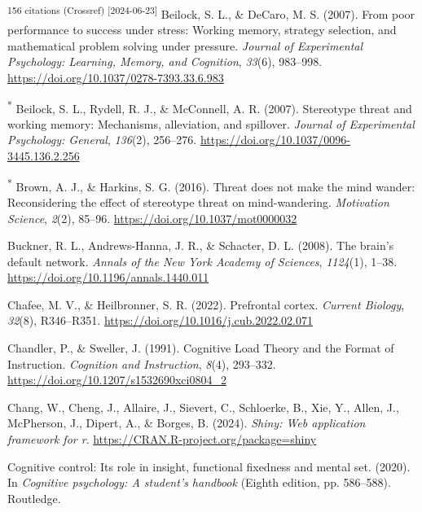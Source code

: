\documentclass[
  stu, a4paper,floatsintext]{apa7}
\newlength{\cslhangindent}
\newenvironment{CSLReferences}[2] %
 {\begin{list}{}{%
  \setlength{\itemindent}{0pt}
  \setlength{\leftmargin}{0pt}
  \setlength{\parsep}{0pt}
  \ifodd #1
   \setlength{\leftmargin}{\cslhangindent}
   \setlength{\itemindent}{-1\cslhangindent}
  \fi
  \setlength{\itemsep}{#2\baselineskip}}}
 {\end{list}}
\begin{document}
\begin{CSLReferences}{1}{0}
\textsuperscript{156 citations (Crossref) {[}2024-06-23{]}} Beilock, S. L., \& DeCaro, M. S. (2007). From poor performance to success under stress: {Working} memory, strategy selection, and mathematical problem solving under pressure. \emph{Journal of Experimental Psychology: Learning, Memory, and Cognition}, \emph{33}(6), 983--998. \url{https://doi.org/10.1037/0278-7393.33.6.983}

\textsuperscript{*} Beilock, S. L., Rydell, R. J., \& McConnell, A. R. (2007). Stereotype threat and working memory: {Mechanisms}, alleviation, and spillover. \emph{Journal of Experimental Psychology: General}, \emph{136}(2), 256--276. \url{https://doi.org/10.1037/0096-3445.136.2.256}

\textsuperscript{*} Brown, A. J., \& Harkins, S. G. (2016). Threat does not make the mind wander: {Reconsidering} the effect of stereotype threat on mind-wandering. \emph{Motivation Science}, \emph{2}(2), 85--96. \url{https://doi.org/10.1037/mot0000032}

Buckner, R. L., Andrews-Hanna, J. R., \& Schacter, D. L. (2008). The brain's default network. \emph{Annals of the New York Academy of Sciences}, \emph{1124}(1), 1--38. \url{https://doi.org/10.1196/annals.1440.011}

Chafee, M. V., \& Heilbronner, S. R. (2022). Prefrontal cortex. \emph{Current Biology}, \emph{32}(8), R346--R351. \url{https://doi.org/10.1016/j.cub.2022.02.071}

Chandler, P., \& Sweller, J. (1991). Cognitive {Load Theory} and the {Format} of {Instruction}. \emph{Cognition and Instruction}, \emph{8}(4), 293--332. \url{https://doi.org/10.1207/s1532690xci0804_2}

Chang, W., Cheng, J., Allaire, J., Sievert, C., Schloerke, B., Xie, Y., Allen, J., McPherson, J., Dipert, A., \& Borges, B. (2024). \emph{Shiny: Web application framework for r}. \url{https://CRAN.R-project.org/package=shiny}

Cognitive control: Its role in insight, functional fixedness and mental set. (2020). In \emph{Cognitive psychology: A student's handbook} (Eighth edition, pp. 586--588). Routledge.


\end{CSLReferences}
\end{document}
